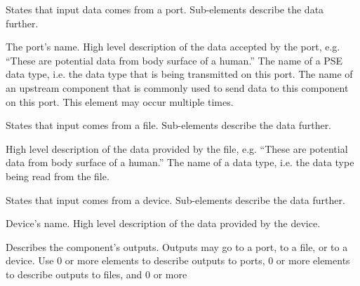 \documentclass[11pt]{article}
\begin{document}
\begin{description}
\begin{description}
\begin{description}
      \begin{description}
         States that input data comes from a port. 
        Sub-elements describe the data further.
        \begin{description}
           The port's name.
           High level description of the data 
          accepted by the port, e.g. ``These are potential data from body 
          surface of a human.''
           The name of a PSE data type, i.e. the 
          data type that is being transmitted on this port.
           The name of an upstream component
          that is commonly used to send data to this component on this
          port.  This element may occur multiple times. 
        \end{description}
         States that input comes from a file.
        Sub-elements describe the data further.
        \begin{description}
           High level description of the data 
          provided by the file, e.g. ``These are potential data from body 
          surface of a human.''
           The name of a \sr{} data type, i.e. the 
          data type being read from the file.  
        \end{description}
         States that input comes from a device.
        Sub-elements describe the data further.
        \begin{description}
           Device's name.
           High level description of the data 
          provided by the device.
        \end{description}
      \end{description}
       Describes the component's outputs.  Outputs may
      go to a port, to a file, or to a device.  Use 0 or more
       elements to describe outputs to ports, 0 or more
       elements to describe outputs to files, and 0 or more

\end{description}
\end{description}
\end{description}
\end{document}
